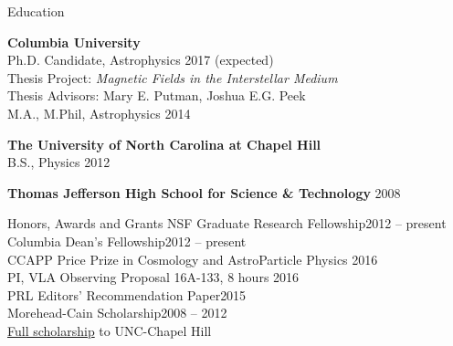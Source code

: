 \documentclass{resume_clark} %
\begin{document}

\begin{rSection}{Education}

{\bf Columbia University}  \\ 
Ph.D. Candidate, Astrophysics  \hfill {2017 (expected)}  \\
\hspace*{0.5cm}Thesis Project: {\em Magnetic Fields in the Interstellar Medium}\\
\hspace*{0.5cm}Thesis Advisors: Mary E. Putman, Joshua E.G. Peek\\
M.A., M.Phil, Astrophysics \hfill {2014}  \\

\vspace{-0.3cm}

{\bf The University of North Carolina at Chapel Hill}\\ 
B.S., Physics \hfill {2012}\\

\vspace{-0.3cm}

{\bf Thomas Jefferson High School for Science \& Technology} \hfill {2008}\\

\end{rSection}


\begin{rSection}{Honors, Awards and Grants}
NSF Graduate Research Fellowship\hfill {2012 -- present}\\
Columbia Dean's Fellowship\hfill {2012 -- present}\\
CCAPP Price Prize in Cosmology and AstroParticle Physics \hfill{2016}\\
PI, VLA Observing Proposal 16A-133, 8 hours \hfill{2016}\\
PRL Editors' Recommendation Paper\hfill {2015}\\
Morehead-Cain Scholarship\hfill {2008 -- 2012}\\
\hspace*{0.5cm}\href{http://www.moreheadcain.org}{Full scholarship} to UNC-Chapel Hill\\

\end{rSection}
\end{document}
